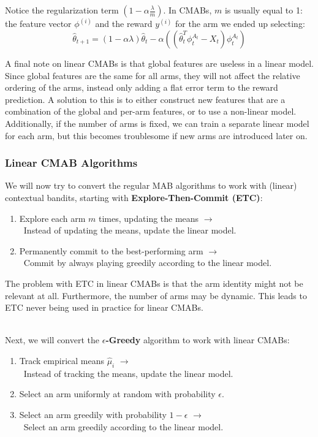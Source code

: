 \documentclass[12pt]{article}
\begin{document}
\noindent
Notice the regularization term $\left( 1 - \alpha \frac{\lambda}{m} \right)$.
In CMABs, $m$ is usually equal to 1: the feature vector $\phi^{(i)}$ and the reward $y^{(i)}$ for the arm we ended up selecting:
\[ \hat{\theta}_{t + 1} = (1 - \alpha \lambda) \hat{\theta}_t - \alpha \left( \left( \hat{\theta}_t^T \phi_t^{A_t} - X_t \right) \phi_t^{A_t} \right) \]

\newpage
\noindent
A final note on linear CMABs is that global features are useless in a linear model.
Since global features are the same for all arms, they will not affect the relative ordering of the arms, instead only adding a flat error term to the reward prediction.
A solution to this is to either construct new features that are a combination of the global and per-arm features, or to use a non-linear model.
Additionally, if the number of arms is fixed, we can train a separate linear model for each arm, but this becomes troublesome if new arms are introduced later on.

\subsubsection{Linear CMAB Algorithms}
We will now try to convert the regular MAB algorithms to work with (linear) contextual bandits, starting with \textbf{Explore-Then-Commit (ETC)}:

\begin{enumerate}
    \item Explore each arm $m$ times, updating the means $\rightarrow$\\ \-\, Instead of updating the means, update the linear model.
    \item Permanently commit to the best-performing arm $\rightarrow$\\ \-\, Commit by always playing greedily according to the linear model.
\end{enumerate}

\noindent
The problem with ETC in linear CMABs is that the arm identity might not be relevant at all.
Furthermore, the number of arms may be dynamic.
This leads to ETC never being used in practice for linear CMABs.

\noindent
\\
Next, we will convert the \textbf{$\epsilon$-Greedy} algorithm to work with linear CMABs:

\begin{enumerate}
    \item Track empirical means $\hat{\mu}_i$ $\rightarrow$\\ \-\, Instead of tracking the means, update the linear model.
    \item Select an arm uniformly at random with probability $\epsilon$.
    \item Select an arm greedily with probability $1 - \epsilon$ $\rightarrow$\\ \-\, Select an arm greedily according to the linear model.
\end{enumerate}
\end{document}
